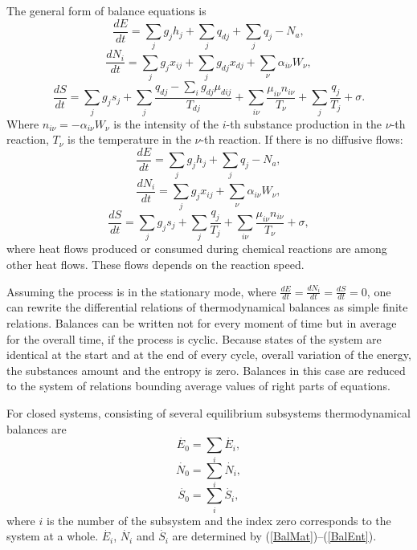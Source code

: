 \documentclass[epjST]{svjour}
\begin{document}
The general form of balance equations is
\begin{equation}
\frac{dE}{dt} = \sum_j{g_j h_j} + \sum_j{q_{dj}} + \sum_j{q_j} - N_a,
\label{BalMat}
\end{equation}
\begin{equation}
\frac{dN_i}{dt} = \sum_j{g_j x_{ij}} + \sum_j{g_{dj} x_{dj}} + \sum_{\nu} {\alpha_{i\nu} W_{\nu}},
\label{BalEne}
\end{equation}
\begin{equation}
\frac{dS}{dt} = \sum_j{g_j s_j} + \sum_j{\frac{q_{dj} - \sum_i{g_{dj} \mu_{dij}}}{T_{dj}}} + \sum_{i\nu}{\frac{\mu_{i\nu}n_{i\nu}}{T_{\nu}}} + \sum_j{\frac{q_j}{T_j}} + \sigma.
\label{BalEnt}
\end{equation}
Where $n_{i\nu} = -\alpha_{i\nu}W_{\nu}$ is the intensity of the $i$-th substance production in the $\nu$-th reaction, $T_{\nu}$ is the temperature in the $\nu$-th reaction. If there is no diffusive flows:
\begin{equation}
\frac{dE}{dt} = \sum_j{g_j h_j} + \sum_j{q_j} - N_a,
\label{BalMatNoD}
\end{equation}
\begin{equation}
\frac{dN_i}{dt} = \sum_j {g_j x_{ij}} + \sum_{\nu}{\alpha_{i\nu}W_{\nu}},
\label{BalEneNoD}
\end{equation}
\begin{equation}
\frac{dS}{dt} = \sum_j{g_j s_j} + \sum_j{\frac{q_j}{T_j}} + \sum_{i\nu}{\frac{\mu_{i\nu}n_{i\nu}}{T_{\nu}}} + \sigma,
\label{BalEntNoD}
\end{equation}
where heat flows produced or consumed during chemical reactions are among other heat flows. These flows depends on the reaction speed.

Assuming the process is in the stationary mode, where $\frac{dE}{dt} = \frac{dN_i}{dt} = \frac{dS}{dt} = 0$, one can rewrite the differential relations of thermodynamical balances as simple finite relations. Balances can be written not for every moment of time but in average for the overall time, if the process is cyclic. Because states of the system are identical at the start and at the end of every cycle, overall variation of the energy, the substances amount and the entropy is zero. Balances in this case are reduced to the system of relations bounding average values of right parts of equations.

For closed systems, consisting of several equilibrium subsystems thermodynamical balances are
\[
\dot{E_0} = \sum_i{\dot{E_i}},
\]
\[
\dot{N_0} = \sum_i{\dot{N_i}},
\]
\[
\dot{S_0} = \sum_i{\dot{S_i}},
\]
where $i$ is the number of the subsystem and the index zero corresponds to the system at a whole. $\dot{E_i}$, $\dot{N_i}$ and $\dot{S_i}$ are determined by (\ref{BalMat})--(\ref{BalEnt}).
\end{document}
